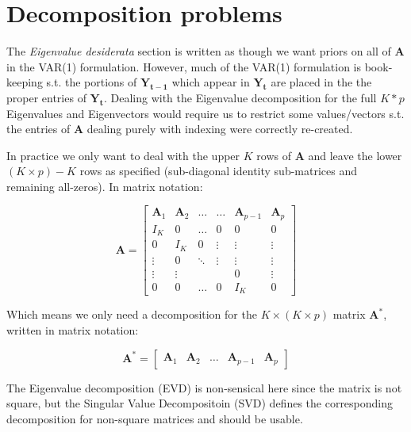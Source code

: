 \section{Decomposition problems}

The \emph{Eigenvalue desiderata} section is written as though we want
priors on all of $\mathbf{A}$ in the VAR(1) formulation.  However, much
of the VAR(1) formulation is book-keeping s.t. the portions of
$\mathbf{Y_{t-1}}$ which appear in $\mathbf{Y_t}$ are placed in the the
proper entries of $\mathbf{Y_t}$.  Dealing with the Eigenvalue
decomposition for the full $K*p$ Eigenvalues and Eigenvectors would
require us to restrict some values/vectors s.t. the entries of
$\mathbf{A}$ dealing purely with indexing were correctly re-created. 

In practice we only want to deal with the upper $K$ rows of
$\mathbf{A}$ and leave the lower $(K\times p) - K$ rows as specified
(sub-diagonal identity sub-matrices and remaining all-zeros).  In matrix
notation:

\begin{equation}
\mathbf{A} = \begin{bmatrix*}
\mathbf{A}_1       & \mathbf{A}_2     & \ldots & \ldots & \mathbf{A}_{p-1} & \mathbf{A}_p    \\ 
I_K       & 0      & \ldots & 0       & 0  & 0     \\ 
0         & I_K    & 0      & \vdots   & \vdots & \vdots      \\ 
\vdots    & 0      & \ddots & \vdots  & \vdots & \vdots      \\
\vdots    & \vdots &        &         & 0      & \vdots      \\ 
0         & 0      & \ldots & 0       & I_K    & 0 
\end{bmatrix*}
\end{equation}

Which means we only need a decomposition for the $K\times (K \times p)$
matrix $\mathbf{A}^*$, written in matrix notation:

\begin{equation}
\mathbf{A}^* = \begin{bmatrix*}
\mathbf{A}_1       & \mathbf{A}_2    & \ldots & \mathbf{A}_{p-1} & \mathbf{A}_p     
\end{bmatrix*}
\end{equation}

The Eigenvalue decomposition (EVD) is non-sensical here since the matrix is
not square, but the Singular Value Decompositoin (SVD) defines the
corresponding decomposition for non-square matrices and should be
usable.  

